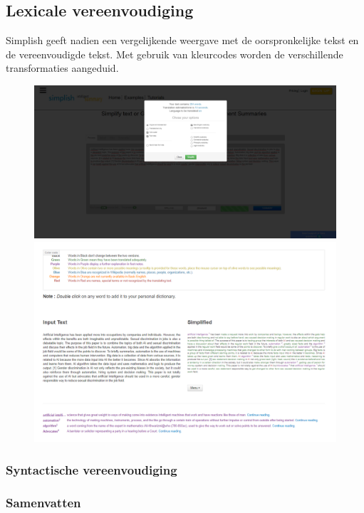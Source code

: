 \subsection{Lexicale vereenvoudiging}

Simplish geeft nadien een vergelijkende weergave met de oorspronkelijke tekst en de vereenvoudigde tekst. Met gebruik van kleurcodes worden de verschillende transformaties aangeduid.

\begin{figure}
	\includegraphics{img/simplish-input.png}
	\includegraphics{img/simplish-output.png}
\end{figure}

\subsubsection{Syntactische vereenvoudiging}

\subsubsection{Samenvatten}

